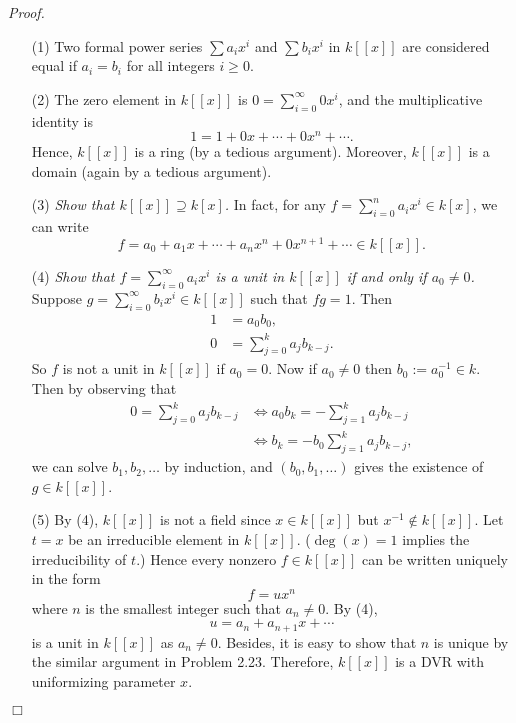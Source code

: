 \documentclass{article}
\begin{document}
\emph{Proof.}
\begin{enumerate}
\item[(1)]
  Two formal power series $\sum a_i x^i$ and $\sum b_i x^i$ in $k[[x]]$
  are considered equal if $a_i = b_i$ for all integers $i \geq 0$.

\item[(2)]
  The zero element in $k[[x]]$ is $0 = \sum_{i=0}^{\infty} 0 x^i$, and the multiplicative identity is
  \[
    1 = 1 + 0 x + \cdots + 0 x^n + \cdots.
  \]
  Hence, $k[[x]]$ is a ring (by a tedious argument).
  Moreover, $k[[x]]$ is a domain (again by a tedious argument).

\item[(3)]
  \emph{Show that $k[[x]] \supseteq k[x]$.}
  In fact, for any $f = \sum_{i=0}^{n} a_i x^i \in k[x]$, we can write
  \[
    f = a_0 + a_1 x + \cdots + a_n x^n + 0 x^{n+1} + \cdots \in k[[x]].
  \]

\item[(4)]
  \emph{Show that $f = \sum_{i=0}^{\infty} a_i x^i$ is a unit in $k[[x]]$
  if and only if $a_0 \neq 0$.}
  Suppose $g = \sum_{i=0}^{\infty} b_i x^i \in k[[x]]$ such that $fg = 1$.
  Then
  \begin{align*}
    1 &= a_0 b_0, \\
    0 &= \sum_{j=0}^{k} a_j b_{k-j}.
  \end{align*}
  So $f$ is not a unit in $k[[x]]$ if $a_0 = 0$.
  Now if $a_0 \neq 0$ then $b_0 := a_0^{-1} \in k$.
  Then by observing that
  \begin{align*}
    0 = \sum_{j=0}^{k} a_j b_{k-j}
    &\Longleftrightarrow
    a_0 b_k = -\sum_{j=1}^{k} a_j b_{k-j} \\
    &\Longleftrightarrow
    b_k = -b_0 \sum_{j=1}^{k} a_j b_{k-j},
  \end{align*}
  we can solve $b_1, b_2, \ldots$ by induction, and $(b_0, b_1, \ldots)$ gives
  the existence of $g \in k[[x]]$.

\item[(5)]
  By (4), $k[[x]]$ is not a field since $x \in k[[x]]$ but $x^{-1} \not\in k[[x]]$.
  Let $t = x$ be an irreducible element in $k[[x]]$.
  ($\deg(x) = 1$ implies the irreducibility of $t$.)
  Hence every nonzero $f \in k[[x]]$ can be written uniquely in
  the form
  \[
    f = u x^n
  \]
  where $n$ is the smallest integer such that $a_{n} \neq 0$.
  By (4),
  \[
    u = a_n + a_{n+1} x + \cdots
  \]
  is a unit in $k[[x]]$ as $a_n \neq 0$.
  Besides, it is easy to show that $n$ is unique by the similar argument in Problem 2.23.
  Therefore, $k[[x]]$ is a DVR with uniformizing parameter $x$.
\end{enumerate}
$\Box$ \\\\
\end{document}
